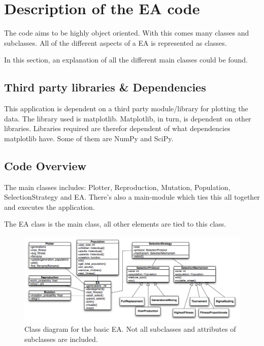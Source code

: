 \section{Description of the EA code}
\label{sec:desccode}
The code aims to be highly object oriented. With this comes many classes and subclasses. All of the different 
aspects of a EA is represented as classes. 

In this section, an explanation of all the different main classes could be found.

\subsection{Third party libraries \& Dependencies}
\label{sec:thirdparty}

This application is dependent on a third party module/library for plotting the data. The library used
is matplotlib. Matplotlib, in turn, is dependent on other libraries. Libraries required are therefor dependent
of what dependencies matplotlib have. Some of them are NumPy and SciPy. 

\subsection{Code Overview}

The main classes includes: Plotter, Reproduction, Mutation, Population, SelectionStrategy and EA.
There's also a main-module which ties this all together and executes the application. 

The EA class is the main class, all other elements are tied to this class. 

\begin{figure}[h!]
    \begin{center}
        \includegraphics[width=\textwidth]{diagrams/classdiagram.png}
    \end{center}
    \label{fig:classdiagram}
    \caption[Class diagram]%
    {Class diagram for the basic EA. Not all subclasses and attributes of subclasses are included.}
\end{figure}

